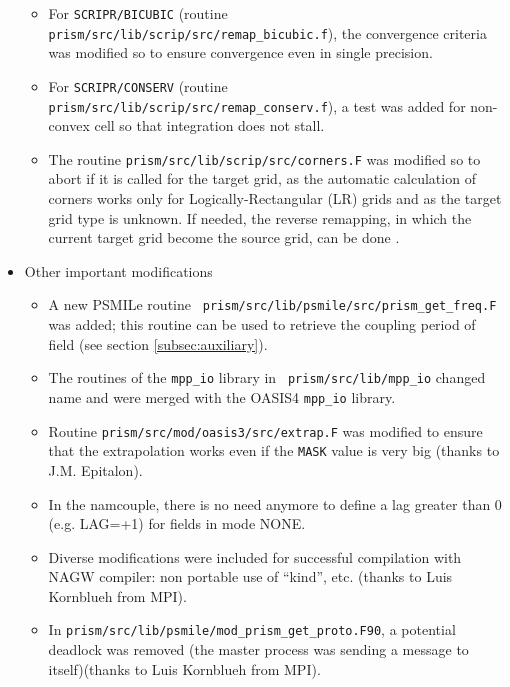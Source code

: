 \begin{itemize}
\begin{itemize}
  \item For {\tt SCRIPR/BICUBIC} (routine {\tt
      prism/src/lib/scrip/src/remap\_bicubic.f}), the convergence
    criteria was modified so to ensure convergence even in single
    precision.

  \item For {\tt SCRIPR/CONSERV} (routine {\tt
      prism/src/lib/scrip/src/remap\_conserv.f}), a test was added for
    non-convex cell so that integration does not stall.

  \item The routine {\tt prism/src/lib/scrip/src/corners.F} was
    modified so to abort if it is called for the target grid, as the
    automatic calculation of corners works only for
    Logically-Rectangular (LR) grids and as the target grid type is
    unknown. If needed, the reverse remapping, in which the current
    target grid become the source grid, can be done .

  \end{itemize}

\item Other important modifications

  \begin{itemize}

  \item A new PSMILe routine {\tt
      prism/src/lib/psmile/src/prism\_get\_freq.F} was added; this
    routine can be used to retrieve the coupling period of field (see
    section \ref{subsec:auxiliary}).

  \item The routines of the {\tt mpp\_io} library in {\tt
      prism/src/lib/mpp\_io} changed name and were merged with the
    OASIS4 {\tt mpp\_io} library.

  \item Routine {\tt prism/src/mod/oasis3/src/extrap.F} was modified
    to ensure that the extrapolation works even if the {\tt MASK}
    value is very big (thanks to J.M. Epitalon).

  \item In the namcouple, there is no need anymore to define a lag
    greater than 0 (e.g.  LAG=+1) for fields in mode NONE.

  \item Diverse modifications were included for successful compilation
    with NAGW compiler: non portable use of ``kind'', etc. (thanks to
    Luis Kornblueh from MPI).

  \item In {\tt prism/src/lib/psmile/mod\_prism\_get\_proto.F90}, a
    potential deadlock was removed (the master process was sending a
    message to itself)(thanks to Luis Kornblueh from MPI).


\end{itemize}
\end{itemize}
